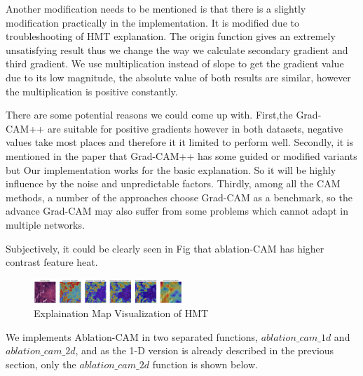 \documentclass[conference]{IEEEtran}
\begin{document}
Another modification needs to be mentioned is that there is a slightly modification practically in the implementation. It is modified due to troubleshooting of HMT explanation. The origin function gives an extremely unsatisfying result thus we change the way we calculate secondary gradient and third gradient. We use multiplication instead of slope to get the gradient value due to its low magnitude, the absolute value of both results are similar, however the multiplication is positive constantly.\par
There are some potential reasons we could come up with. First,the Grad-CAM++ are suitable for positive gradients however in both datasets, negative values take most places and therefore it it limited to perform well. Secondly, it is mentioned in the paper that Grad-CAM++ has some guided or modified variants but Our implementation works for the basic explanation. So it will be highly influence by the noise and unpredictable factors. Thirdly, among all the CAM methods, a number of the approaches choose Grad-CAM as a benchmark, so the advance Grad-CAM may also suffer from some problems which cannot adapt in multiple networks.\par
Subjectively, it could be clearly seen in Fig that ablation-CAM has higher contrast feature heat.

\begin{figure}[h] 
    \centering
    \includegraphics[width=0.5\textwidth]{./graphs/plot.png}
    \caption{Explaination Map Visualization of HMT} 
\end{figure}

We implements Ablation-CAM in two separated functions, $ablation\_cam\_1d$ and $ablation\_cam\_2d$, and  as the 1-D version is already described in the previous section, only the $ablation\_cam\_2d$ function is shown below.
\end{document}
